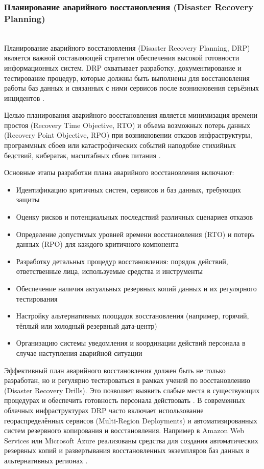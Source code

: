 
\subsubsection{Планирование аварийного восстановления (Disaster Recovery Planning)} ~\\

Планирование аварийного восстановления (Disaster Recovery Planning, DRP) является важной составляющей стратегии обеспечения высокой готовности информационных систем. DRP охватывает разработку, документирование и тестирование процедур, которые должны быть выполнены для восстановления работы баз данных и связанных с ними сервисов после возникновения серьёзных инцидентов \autocite{SnedakerS}.

Целью планирования аварийного восстановления является минимизация времени простоя (Recovery Time Objective, RTO) и объема возможных потерь данных (Recovery Point Objective, RPO) при возникновении отказов инфраструктуры, программных сбоев или катастрофических событий наподобие стихийных бедствий, кибератак, масштабных сбоев питания \autocite{Kleppmann}.

Основные этапы разработки плана аварийного восстановления включают:
\begin{itemize}
    \item Идентификацию критичных систем, сервисов и баз данных, требующих защиты
    \item Оценку рисков и потенциальных последствий различных сценариев отказов
    \item Определение допустимых уровней времени восстановления (RTO) и потерь данных (RPO) для каждого критичного компонента
    \item Разработку детальных процедур восстановления: порядок действий, ответственные лица, используемые средства и инструменты
    \item Обеспечение наличия актуальных резервных копий данных и их регулярного тестирования
    \item Настройку альтернативных площадок восстановления (например, горячий, тёплый или холодный резервный дата-центр) \autocite{RajeshBasa}
    \item Организацию системы уведомления и координации действий персонала в случае наступления аварийной ситуации
\end{itemize}
Эффективный план аварийного восстановления должен быть не только разработан, но и регулярно тестироваться в рамках учений по восстановлению (Disaster Recovery Drills). Это позволяет выявить слабые места в существующих процедурах и обеспечить готовность персонала действовать \autocite{WallaceWebber}.
В современных облачных инфраструктурах DRP часто включает использование геораспределённых сервисов (Multi-Region Deployments) и автоматизированных систем резервного копирования и восстановления. Например в Amazon Web Services или Microsoft Azure реализованы средства для создания автоматических резервных копий и развертывания восстановленных экземпляров баз данных в альтернативных регионах \autocite{AmazonRds}.


